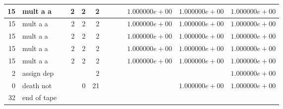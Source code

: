 \documentclass{article}
\begin{document}
\begin{tabular}{|r|l|r|r|r|r||r|r||r|r|r|r|}
15 & mult a a & & 2 & 2 & 2 & & & &$ 1.000000e+00 $&$ 1.000000e+00 $&$ 1.000000e+00 $\\ \hline 
15 & mult a a & & 2 & 2 & 2 & & & &$ 1.000000e+00 $&$ 1.000000e+00 $&$ 1.000000e+00 $\\ \hline 
15 & mult a a & & 2 & 2 & 2 & & & &$ 1.000000e+00 $&$ 1.000000e+00 $&$ 1.000000e+00 $\\ \hline 
15 & mult a a & & 2 & 2 & 2 & & & &$ 1.000000e+00 $&$ 1.000000e+00 $&$ 1.000000e+00 $\\ \hline 
15 & mult a a & & 2 & 2 & 2 & & & &$ 1.000000e+00 $&$ 1.000000e+00 $&$ 1.000000e+00 $\\ \hline 
2 & assign dep & & & & 2 & & & & & &$ 1.000000e+00 $\\ \hline 
0 & death not & & & 0 & 21 & & & & &$ 1.000000e+00 $&$ 1.000000e+00 $\\ \hline 
 32 & end of tape & & & & & & & & & &  \\ \hline 
\end{tabular}
\end{document}
